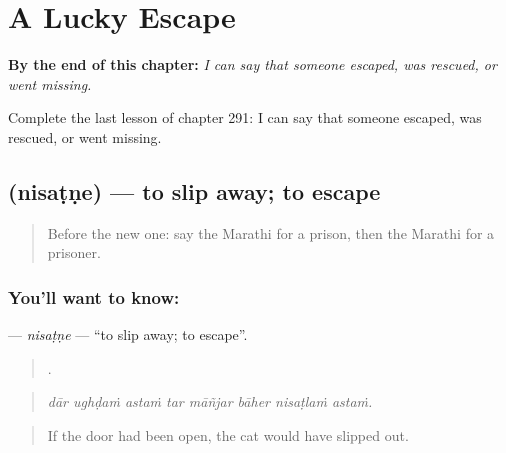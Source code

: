 
\chapter{A Lucky Escape}
\label{ch:mr-a-lucky-escape}

\begin{chapteropening}
\textbf{By the end of this chapter:} \emph{I can say that someone escaped, was rescued, or went missing.}

Complete the last lesson of chapter 291: I can say that someone escaped, was rescued, or went missing.
\end{chapteropening}

\section[\texorpdfstring{\mr{निसटणे} (nisaṭṇe)}{निसटणे (nisaṭṇe)}]{ (nisaṭṇe) — to slip away; to escape}

\label{lesson:MR-C291-nisatne}



\begin{quote}
Before the new one: say the Marathi for a prison, then the Marathi for a prisoner.
\end{quote}

\subsection*{You'll want to know: }
\textbf{} — \emph{nisaṭṇe} — \textquotedblleft{}to slip away; to escape\textquotedblright{}.

\begin{quote}
       .
\end{quote}

\begin{quote}
\emph{dār ughḍaṁ astaṁ tar māñjar bāher nisaṭlaṁ astaṁ.}
\end{quote}

\begin{quote}
If the door had been open, the cat would have slipped out.
\end{quote}

